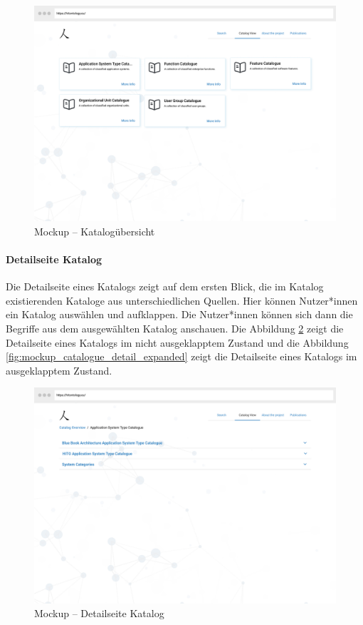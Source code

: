 \begin{figure}[ht]
	\centering
    	\includegraphics[width=1.45\textwidth, angle=90]{Images/Mockup_Katalog_Uebersicht}
   	\caption[Mockup -- Katalogübersicht]{Mockup -- Katalogübersicht}
   	\label{fig:mockup_catalogue_overview}
\end{figure}

\clearpage

\paragraph{Detailseite Katalog}

Die Detailseite eines Katalogs zeigt auf dem ersten Blick, die im Katalog existierenden Kataloge aus unterschiedlichen Quellen.
Hier können Nutzer*innen ein Katalog auswählen und aufklappen.
Die Nutzer*innen können sich dann die Begriffe aus dem ausgewählten Katalog anschauen.
Die Abbildung \ref{fig:mockup_catalogue_detail} zeigt die Detailseite eines Katalogs im nicht ausgeklapptem Zustand und die Abbildung \ref{fig:mockup_catalogue_detail_expanded} zeigt die Detailseite eines Katalogs im ausgeklapptem Zustand.

\begin{figure}[H]
	\centering
    	\includegraphics[width=1.45\textwidth, angle=-90]{Images/Mockup_Katalog_Detailseite}
   	\caption[Mockup -- Detailseite Katalog 1]{Mockup -- Detailseite Katalog}
   	\label{fig:mockup_catalogue_detail}
\end{figure}

